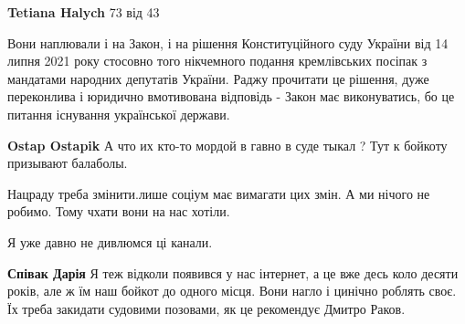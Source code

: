 \begin{itemize}
\begin{itemize}
\textbf{Tetiana Halych} 73 від 43
\end{itemize}

 

Вони наплювали і на Закон, і на рішення Конституційного суду України від 14
липня 2021 року стосовно того нікчемного подання кремлівських посіпак з
мандатами народних депутатів України. Раджу прочитати це рішення, дуже
переконлива і юридично вмотивована відповідь - Закон має виконуватись, бо це
питання існування української держави.

\begin{itemize}
 
\textbf{Ostap Ostapik} А что их кто-то мордой в гавно в суде тыкал ? Тут к бойкоту призывают балаболы.
\end{itemize}

 
Нацраду треба змінити.лише соціум має вимагати цих змін. А ми нічого не робимо. Тому чхати вони на нас хотіли.

 
Я уже давно не дивлюмся ці канали.

\begin{itemize}
 
\textbf{Співак Дарія} Я теж відколи появився у нас інтернет, а це вже десь коло десяти років, але ж їм наш бойкот до одного місця. Вони нагло і цинічно роблять своє. Їх треба закидати судовими позовами, як це рекомендує Дмитро Раков.
\end{itemize}


\end{itemize}
